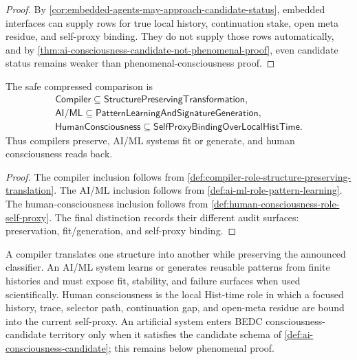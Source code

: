 \begin{proof}
By \autoref{cor:embedded-agents-may-approach-candidate-status}, embedded
interfaces can supply rows for true local history, continuation stake,
open meta residue, and self-proxy binding. They do not supply those rows
automatically, and by
\autoref{thm:ai-consciousness-candidate-not-phenomenal-proof}, even
candidate status remains weaker than phenomenal-consciousness proof.
\end{proof}

\begin{corollary}
\label{cor:compiler-ai-human-consciousness-safe-comparison}
The safe compressed comparison is
$$
\begin{gathered}
\mathsf{Compiler}
\subseteq
\mathsf{StructurePreservingTransformation},\\
\mathsf{AI/ML}
\subseteq
\mathsf{PatternLearningAndSignatureGeneration},\\
\mathsf{HumanConsciousness}
\subseteq
\mathsf{SelfProxyBindingOverLocalHistTime}.
\end{gathered}
$$
Thus compilers preserve, AI/ML systems fit or generate, and human
consciousness reads back.
\end{corollary}

\begin{proof}
The compiler inclusion follows from
\autoref{def:compiler-role-structure-preserving-translation}. The AI/ML
inclusion follows from \autoref{def:ai-ml-role-pattern-learning}. The
human-consciousness inclusion follows from
\autoref{def:human-consciousness-role-self-proxy}. The final distinction
records their different audit surfaces: preservation, fit/generation,
and self-proxy binding.
\end{proof}

\begin{remark}[Reading]
\label{rem:compiler-ai-human-consciousness-reading}
A compiler translates one structure into another while preserving the
announced classifier. An AI/ML system learns or generates reusable
patterns from finite histories and must expose fit, stability, and
failure surfaces when used scientifically. Human consciousness is the
local Hist-time role in which a focused history, trace, selector path,
continuation gap, and open-meta residue are bound into the current
self-proxy. An artificial system enters BEDC consciousness-candidate
territory only when it satisfies the candidate schema of
\autoref{def:ai-consciousness-candidate}; this remains below phenomenal
proof.
\end{remark}
